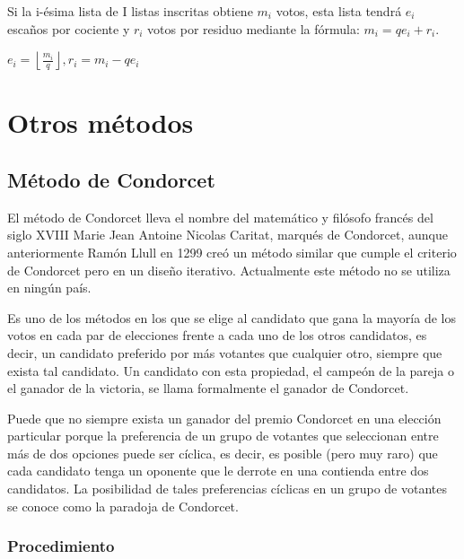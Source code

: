 \documentclass[12pt,a4paper,]{book}
\numberwithin{dummy}{section}
\theoremstyle{ocrenumbox}
\theoremstyle{blacknumex}
\theoremstyle{blacknumbox}
\theoremstyle{ocrenum}
\theoremstyle{ocrenum}
\begin{document}
Si la i-ésima lista de I listas inscritas obtiene \({m_{i}}\) votos,
esta lista tendrá \({e_{i}}\) escaños por cociente y \({r_{i}}\) votos
por residuo mediante la fórmula: \({m_{i}=qe_{i}+r_{i}}\).

\({e_{i}=\left\lfloor {\frac {m_{i}}{q}}\right\rfloor ,r_{i}=m_{i}-qe_{i}}\)

\hypertarget{otros-muxe9todos}{%
\section{Otros métodos}\label{otros-muxe9todos}}

\hypertarget{muxe9todo-de-condorcet}{%
\subsection{Método de Condorcet}\label{muxe9todo-de-condorcet}}

El método de Condorcet lleva el nombre del matemático y filósofo francés
del siglo XVIII Marie Jean Antoine Nicolas Caritat, marqués de
Condorcet, aunque anteriormente Ramón Llull en 1299 creó un método
similar que cumple el criterio de Condorcet pero en un diseño iterativo.
Actualmente este método no se utiliza en ningún país.

Es uno de los métodos en los que se elige al candidato que gana la
mayoría de los votos en cada par de elecciones frente a cada uno de los
otros candidatos, es decir, un candidato preferido por más votantes que
cualquier otro, siempre que exista tal candidato. Un candidato con esta
propiedad, el campeón de la pareja o el ganador de la victoria, se llama
formalmente el ganador de Condorcet.

Puede que no siempre exista un ganador del premio Condorcet en una
elección particular porque la preferencia de un grupo de votantes que
seleccionan entre más de dos opciones puede ser cíclica, es decir, es
posible (pero muy raro) que cada candidato tenga un oponente que le
derrote en una contienda entre dos candidatos. La posibilidad de tales
preferencias cíclicas en un grupo de votantes se conoce como la paradoja
de Condorcet.

\hypertarget{procedimiento}{%
\subsubsection{Procedimiento}\label{procedimiento}}
\end{document}
